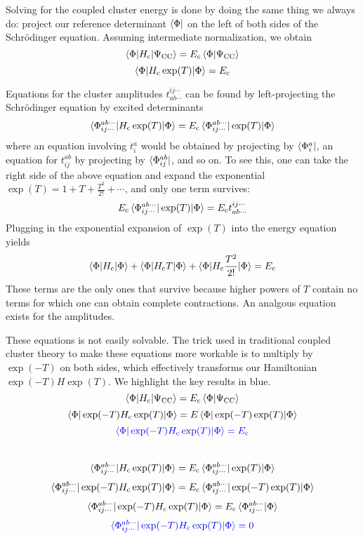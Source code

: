 \documentclass{article}
\newcommand{\Ec}{E_{\mathrm{c}}}
\newcommand{\Hc}{H_{\mathrm{c}}}
\begin{document}
Solving for the coupled cluster energy is done by doing the same thing we always do:
project our reference determinant $\bra{\Phi}$ on the left of both sides 
of the Schr{\"o}dinger equation.
Assuming intermediate normalization, we obtain
\[\braket{\Phi | \Hc | \Psi_{\mathrm{CC}}} = E_c \braket{\Phi|\Psi_{\mathrm{CC}}} \]
\[\braket{\Phi | \Hc \exp(T) | \Phi} = \Ec \]

Equations for the cluster amplitudes $t_{a b \cdots }^{i j \cdots}$
can be found by left-projecting the Schr{\"o}dinger equation by excited determinants
\[ \braket{ \Phi_{i j \cdots }^{a b \cdots} | \Hc \exp(T) | \Phi} = 
   \Ec \braket{\Phi_{i j \cdots }^{a b \cdots} | \exp(T) | \Phi} \]
where an equation involving $t_i^a$ would be obtained by projecting by $\bra{\Phi_{i}^{a}}$,
an equation for $t_{ij}^{ab}$ by projecting by $\bra{\Phi_{ij}^{ab}}$, and so on. 
To see this, one can take the right side of the above equation and expand the exponential $\exp(T) = 1 + T + \frac{T^2}{2!} + \cdots $, and only one term survives:
\[ \Ec \braket{\Phi_{i j \cdots }^{a b \cdots} | \exp(T) | \Phi} = \Ec t_{a b \cdots }^{i j \cdots}\]
Plugging in the exponential expansion of $\exp(T)$ into the energy equation
yields 
\[ \braket{\Phi | \Hc | \Phi} + \braket{\Phi| \Hc T| \Phi} + \braket{\Phi | \Hc \frac{T^2}{2!} | \Phi} = \Ec \]
These terms are the only ones that survive because higher powers of 
$T$ contain no terms for which one can obtain complete contractions. 
An analgous equation exists for the amplitudes.

These equations is not easily solvable. The trick used in traditional coupled cluster 
theory to make these equations more workable is to multiply by $\exp(-T)$ on both sides,
which effectively transforms our Hamiltonian $\exp(-T) H \exp(T)$.
We highlight the key results in blue. 
\[\braket{\Phi | \Hc | \Psi_{\mathrm{CC}}} = E_c \braket{\Phi|\Psi_{\mathrm{CC}}} \]
\[ \braket{\Phi | \exp(-T) \Hc \exp(T) | \Phi } = E \braket{\Phi | \exp(-T) \exp(T) | \Phi} \]
\[ \color{blue} \braket{\Phi | \exp(-T) \Hc \exp(T) | \Phi } = \Ec \]
\quad
\\
\[ \braket{ \Phi_{i j \cdots }^{a b \cdots} | \Hc \exp(T) | \Phi} = 
    \Ec \braket{\Phi_{i j \cdots }^{a b \cdots} | \exp(T) | \Phi}  \]
\[ \braket{ \Phi_{i j \cdots }^{a b \cdots} | \exp(-T) \Hc \exp(T) | \Phi} = 
    \Ec \braket{\Phi_{i j \cdots }^{a b \cdots} | \exp(-T) \exp(T) | \Phi}  \]
\[ \braket{ \Phi_{i j \cdots }^{a b \cdots} | \exp(-T) \Hc \exp(T) | \Phi} = 
    \Ec \braket{\Phi_{i j \cdots }^{a b \cdots} | \Phi}  \]
\[ \color{blue} \braket{ \Phi_{i j \cdots }^{a b \cdots} | \exp(-T) \Hc \exp(T) | \Phi} 
   =  0  \]
\end{document}
